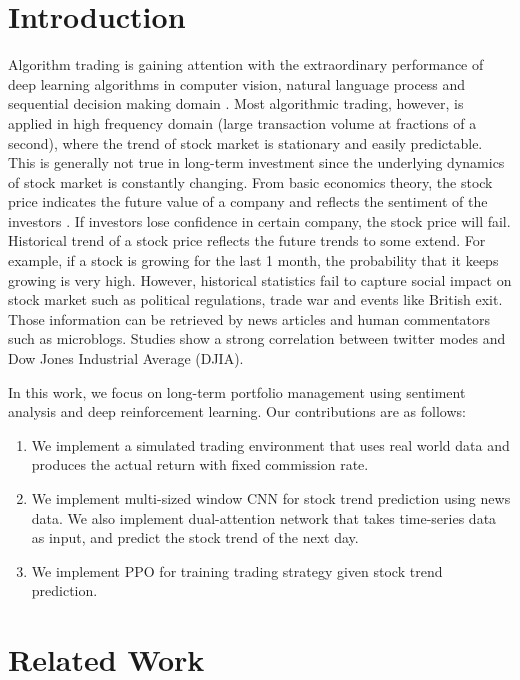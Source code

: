 \documentclass[11pt,a4paper]{article}
\begin{document}
\section{Introduction}
Algorithm trading is gaining attention with the extraordinary performance of deep learning algorithms in computer vision, natural language process and sequential decision making domain \cite{high_frequency_drl}. Most algorithmic trading, however, is applied in high frequency domain (large transaction volume at fractions of a second), where the trend of stock market is stationary and easily predictable. This is generally not true in long-term investment since the underlying dynamics of stock market is constantly changing. From basic economics theory, the stock price indicates the future value of a company and reflects the sentiment of the investors \cite{stock_price_cause}. If investors lose confidence in certain company, the stock price will fail. Historical trend of a stock price reflects the future trends to some extend. For example, if a stock is growing for the last 1 month, the probability that it keeps growing is very high. However, historical statistics fail to capture social impact on stock market such as political regulations, trade war and events like British exit. Those information can be retrieved by news articles and human commentators such as microblogs. Studies \cite{twitter_mode_stock_market} show a strong correlation between twitter modes and Dow Jones Industrial Average (DJIA).

In this work, we focus on long-term portfolio management using sentiment analysis and deep reinforcement learning. Our contributions are as follows:
\begin{enumerate}
  \item We implement a simulated trading environment that uses real world data and produces the actual return with fixed commission rate.
  \item We implement multi-sized window CNN for stock trend prediction using news data. We also implement dual-attention network that takes time-series data as input, and predict the stock trend of the next day.
  \item We implement PPO for training trading strategy given stock trend prediction.
\end{enumerate}


\section{Related Work}
\end{document}
